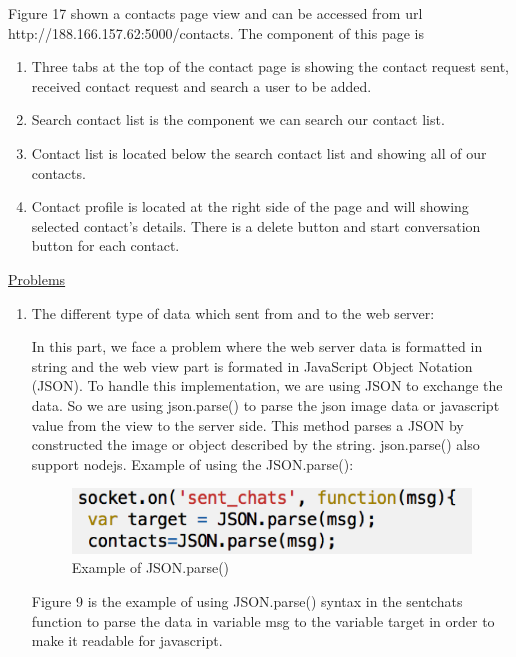 \documentclass{article}
\begin{document}
\begin{enumerate}
	Figure 17 shown a contacts page view and can be accessed from url \\ http://188.166.157.62:5000/contacts. The component of this page is
		
	\begin{enumerate}
		\item
		Three tabs at the top of the contact page is showing the contact request sent, received contact request and search a user to be added.
		\item
		Search contact list is the component we can search our contact list.
		\item
		Contact list is located below the search contact list and showing all of our contacts.
		\item
		Contact profile is located at the right side of the page and will showing selected contact’s details. There is a delete button and start conversation button for each contact.
	\end{enumerate}
	
	\underline{Problems}\\
	
	\begin{enumerate}
		\item 
		The different type of data which sent from and to the web server:
		
		In this part, we face a problem where the web server data is formatted in string and the web view part is formated in JavaScript Object Notation (JSON). To handle this implementation, we are using JSON to exchange the data. So we are using json.parse() to parse the json image data or javascript value from the view to the server side. This method parses a JSON by constructed the image or object described by the string. json.parse() also support nodejs. Example of using the JSON.parse():
		
		\begin{figure}[H]
			\centering
			\includegraphics[scale=0.6]{problemWeb1.png}
			\caption{Example of JSON.parse()}
		\end{figure}
		
		Figure 9 is the example of using JSON.parse() syntax in the sentchats function to parse the data in variable msg to the variable target in order to make it readable for javascript.
		

\end{enumerate}
\end{enumerate}
\end{document}
